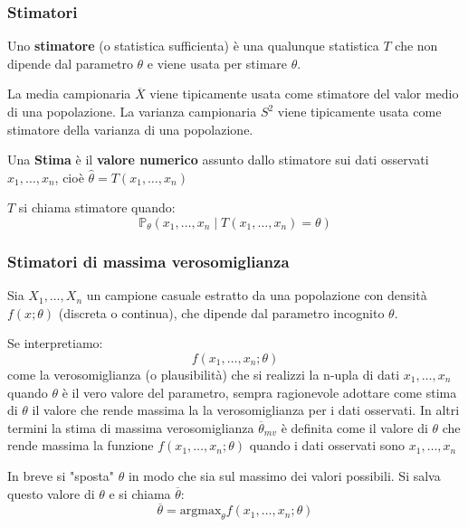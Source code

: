 \documentclass[a4paper]{article}
\theoremstyle{break}
\theoremstyle{break}
\theoremstyle{break}
\theoremstyle{break}
\begin{document}
\subsubsection{Stimatori}
Uno \textbf{stimatore} (o statistica sufficienta) è una qualunque statistica
\( T \) che non dipende dal parametro
\( \theta \) e viene usata per stimare \( \theta \).

\begin{example}
  La media campionaria \( \overline{X} \) viene tipicamente usata come stimatore del valor
  medio di una popolazione. La varianza campionaria \( S^2 \) viene tipicamente usata
  come stimatore della varianza di una popolazione.
\end{example}

\noindent Una \textbf{Stima} è il \textbf{valore numerico} assunto dallo stimatore sui dati
osservati \( x_1, \ldots, x_n \), cioè \( \hat{\theta} = T(x_1,\ldots,x_n) \) 

\vspace{1em}
\noindent \( T \) si chiama stimatore quando:
\[
  \mathbb{P}_{\theta}(x_1, \ldots, x_n \; | \; T(x_1, \ldots, x_n) = \theta)
\] 

\subsubsection{Stimatori di massima verosomiglianza}
Sia \( X_1, \ldots, X_n \) un campione casuale estratto da una popolazione con densità
\( f(x;\theta) \) (discreta o continua), che dipende dal parametro incognito \( \theta \).

\noindent Se interpretiamo:
\[
f(x_1, \ldots, x_n; \theta)
\] 
come la verosomiglianza (o plausibilità) che si realizzi la n-upla di dati
\( x_1, \ldots, x_n \) quando \( \theta \) è il vero valore del parametro, sempra
ragionevole adottare come stima di \( \theta \) il valore che rende massima la la
verosomiglianza per i dati osservati. In altri termini la stima di massima verosomiglianza
\( \overline{\theta}_{mv} \) è definita come il valore di \( \theta \) che rende
massima la funzione \( f(x_1, \ldots, x_n; \theta) \) quando i dati osservati sono
\( x_1, \ldots, x_n \) 

\vspace{1em}
\noindent In breve si "sposta" \( \theta \) in modo che sia sul massimo dei valori possibili.
Si salva questo valore di \( \theta \) e si chiama \( \overline{\theta} \):
\[
\overline{\theta} = \text{argmax}_{\theta} f(x_1, \ldots, x_n; \theta)
\] 
\end{document}
